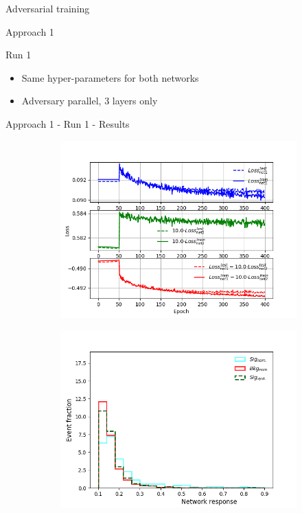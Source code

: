 \begin{frame}[c]
\begin{center}
\Huge Adversarial training
\end{center}
\end{frame}

\begin{frame}{Approach 1}
    \begin{block}{Run 1}
\begin{itemize}
    \item Same hyper-parameters for both networks
    \item Adversary parallel, 3 layers only
\end{itemize}
    \end{block}
\end{frame}

\begin{frame}{Approach 1 - Run 1 - Results}
    \begin{figure}[htbp]
    \centering
    \begin{subfigure}[b]{0.4\textwidth}
        \includegraphics[width=\textwidth]{app1/full_classic_losses.png}
        \label{fig:simple:final:sepa}
    \end{subfigure}
\quad
    \begin{subfigure}[b]{0.4\textwidth}
        \includegraphics[width=\textwidth]{app1/full_classic_syst.png}

\end{subfigure}
\end{figure}
\end{frame}
